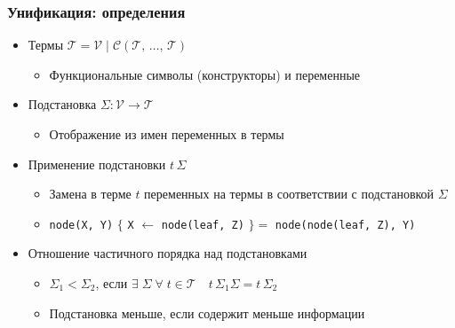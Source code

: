 \documentclass{../../slides-style}
\begin{document}
    \begin{frame}[fragile]
        \frametitle{Унификация: определения}
    \begin{itemize}
        \item Термы $\mathcal{T} = \mathcal{V} \mid \mathcal{C} (\mathcal{T}, \, \ldots, \, \mathcal{T})$
        \begin{itemize}
            \item Функциональные символы (конструкторы) и переменные
        \end{itemize}
        \pause
        \vspace{2mm}
        \item Подстановка $\Sigma : \mathcal{V} \rightarrow \mathcal{T}$
        \begin{itemize}
            \item Отображение из имен переменных в термы  
        \end{itemize}
        \pause
        \vspace{2mm}
        \item Применение подстановки $t \, \Sigma$
        \begin{itemize}
            \item Замена в терме $t$ переменных на термы в соответствии с подстановкой $\Sigma$
            \item 
                \texttt{node(X, Y)}
                $\{$
                    \texttt{X} $\leftarrow$ \texttt{node(leaf, Z)}
                $\} = $ \texttt{node(node(leaf, Z), Y)}
        \end{itemize}
        \pause
        \vspace{2mm}
        \item Отношение частичного порядка над подстановками
        \begin{itemize}
            \item $\Sigma_1 < \Sigma_2$, если $\exists\; \Sigma\; \forall\; t \in \mathcal{T} \quad t\,\Sigma_1\Sigma = t\,\Sigma_2$
            \item Подстановка меньше, если содержит меньше информации
        \end{itemize}
    \end{itemize}
    \end{frame}
\end{document}
